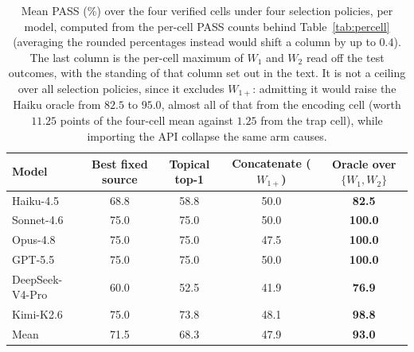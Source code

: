 \documentclass[11pt]{article}
\theoremstyle{plain}
\theoremstyle{definition}
\theoremstyle{remark}
\begin{document}
\begin{table}[t]
\caption{Mean PASS (\%) over the four verified cells under four selection policies, per model,
computed from the per-cell PASS counts behind Table~\ref{tab:percell} (averaging the rounded
percentages instead would shift a column by up to $0.4$). The last column is the per-cell maximum
of $W_1$ and $W_2$ read off the test outcomes, with the standing of that column set out in the
text. It is not a ceiling over all selection policies, since it excludes $W_{1+}$: admitting it
would raise the Haiku oracle from $82.5$ to $95.0$, almost all of that from the encoding cell
(worth $11.25$ points of the four-cell mean against $1.25$ from the trap cell), while importing
the API collapse the same arm causes.}
\centering
\begin{tabular}{@{}lcccc@{}}
\toprule
Model & Best fixed source & Topical top-1 & Concatenate ($W_{1+}$) & Oracle over $\{W_1,W_2\}$ \\
\midrule
Haiku-4.5       & 68.8 & 58.8 & 50.0 & \textbf{82.5} \\
Sonnet-4.6      & 75.0 & 75.0 & 50.0 & \textbf{100.0} \\
Opus-4.8        & 75.0 & 75.0 & 47.5 & \textbf{100.0} \\
GPT-5.5         & 75.0 & 75.0 & 50.0 & \textbf{100.0} \\
DeepSeek-V4-Pro & 60.0 & 52.5 & 41.9 & \textbf{76.9} \\
Kimi-K2.6       & 75.0 & 73.8 & 48.1 & \textbf{98.8} \\
\midrule
Mean            & 71.5 & 68.3 & 47.9 & \textbf{93.0} \\
\bottomrule
\end{tabular}
\label{tab:policies}
\end{table}
\end{document}
